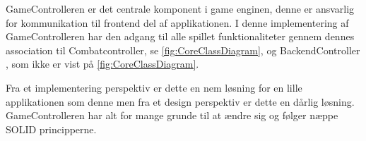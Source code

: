 \noindent GameControlleren er det centrale komponent i game enginen, denne er ansvarlig 
for kommunikation til frontend del af applikationen. I denne implementering af 
GameControlleren har den adgang til alle spillet funktionaliteter gennem dennes
association til Combatcontroller, se \autoref{fig:CoreClassDiagram}, og BackendController
, som ikke er vist på \autoref{fig:CoreClassDiagram}.

Fra et implementering perspektiv er dette en nem løsning for en lille applikationen som denne
men fra et design perspektiv er dette en dårlig løsning. GameControlleren har alt for mange
grunde til at ændre sig og følger næppe SOLID principperne.







